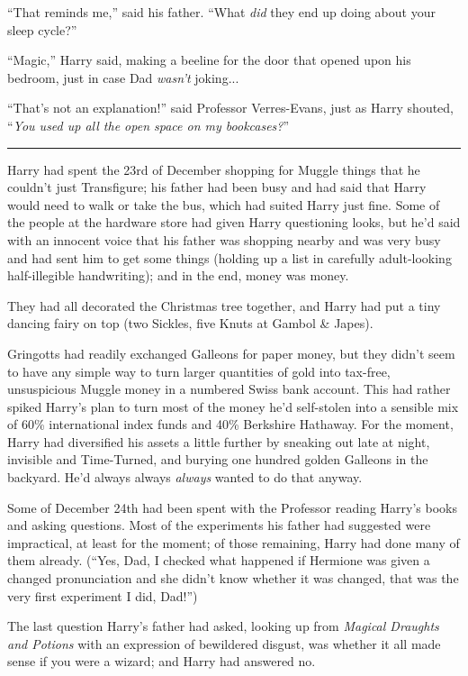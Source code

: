 ``That reminds me,'' said his father. ``What \emph{did} they end up doing about your sleep cycle?''

``Magic,'' Harry said, making a beeline for the door that opened upon his bedroom, just in case Dad \emph{wasn't} joking...

``That's not an explanation!'' said Professor Verres-Evans, just as Harry shouted, ``\emph{You used up all the open space on my bookcases?}''

\begin{center}\rule{3in}{0.4pt}\end{center}

Harry had spent the 23rd of December shopping for Muggle things that he couldn't just Transfigure; his father had been busy and had said that Harry would need to walk or take the bus, which had suited Harry just fine. Some of the people at the hardware store had given Harry questioning looks, but he'd said with an innocent voice that his father was shopping nearby and was very busy and had sent him to get some things (holding up a list in carefully adult-looking half-illegible handwriting); and in the end, money was money.

They had all decorated the Christmas tree together, and Harry had put a tiny dancing fairy on top (two Sickles, five Knuts at Gambol \& Japes).

Gringotts had readily exchanged Galleons for paper money, but they didn't seem to have any simple way to turn larger quantities of gold into tax-free, unsuspicious Muggle money in a numbered Swiss bank account. This had rather spiked Harry's plan to turn most of the money he'd self-stolen into a sensible mix of 60\% international index funds and 40\% Berkshire Hathaway. For the moment, Harry had diversified his assets a little further by sneaking out late at night, invisible and Time-Turned, and burying one hundred golden Galleons in the backyard. He'd always always \emph{always} wanted to do that anyway.

Some of December 24th had been spent with the Professor reading Harry's books and asking questions. Most of the experiments his father had suggested were impractical, at least for the moment; of those remaining, Harry had done many of them already. (``Yes, Dad, I checked what happened if Hermione was given a changed pronunciation and she didn't know whether it was changed, that was the very first experiment I did, Dad!'')

The last question Harry's father had asked, looking up from \emph{Magical Draughts and Potions} with an expression of bewildered disgust, was whether it all made sense if you were a wizard; and Harry had answered no.

